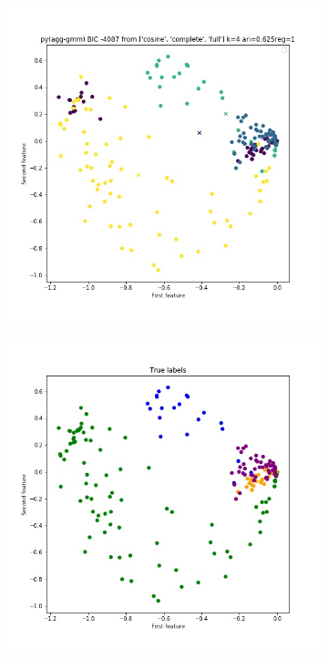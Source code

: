 \documentclass{article}
\begin{document}
\begin{figure}[h!]
\centering
\begin{subfigure}[b]{0.3\linewidth}
  \includegraphics[width=\linewidth]{python_bic_k4.jpg}
\end{subfigure}
\begin{subfigure}[b]{0.3\linewidth}
  \includegraphics[width=\linewidth]{true.jpg}

\end{subfigure}
\end{figure}
\end{document}
